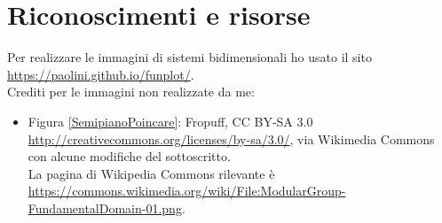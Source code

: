\chapter{Riconoscimenti e risorse}
Per realizzare le immagini di sistemi bidimensionali ho usato il sito \url{https://paolini.github.io/funplot/}.\\
Crediti per le immagini non realizzate da me:
\begin{itemize}
\item Figura \ref{SemipianoPoincare}: Fropuff, CC BY-SA 3.0 \url{http://creativecommons.org/licenses/by-sa/3.0/}, via Wikimedia Commons con alcune modifiche del sottoscritto.\\
La pagina di Wikipedia Commons rilevante \`e \url{https://commons.wikimedia.org/wiki/File:ModularGroup-FundamentalDomain-01.png}.
\end{itemize}